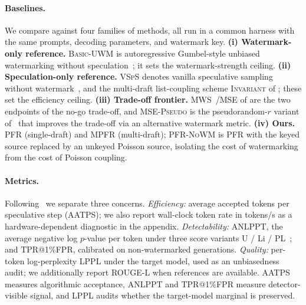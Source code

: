\paragraph{Baselines.}
We compare against four families of methods, all run in a common harness with
the same prompts, decoding parameters, and watermark key.
\textbf{(i) Watermark-only reference.} \textsc{Basic-UWM} is autoregressive
Gumbel-style unbiased watermarking without speculation~\citep{aaronson2023watermarking};
it sets the watermark-strength ceiling.
\textbf{(ii) Speculation-only reference.} \textsc{VSpS} denotes vanilla
speculative sampling without watermark~\citep{leviathan2023fast}, and the
multi-draft list-coupling scheme \textsc{Invariant} of \citet{rowan2025list};
these set the efficiency ceiling.
\textbf{(iii) Trade-off frontier.} \textsc{MWS}~/\textsc{MSE} of
\citet{hu2024inevitable} are the two endpoints of the no-go trade-off, and
\textsc{MSE-Pseudo} is the pseudorandom-$r$ variant
of~\citet{he2026improving} that improves the trade-off via an alternative
watermark metric.
\textbf{(iv) Ours.} \textsc{PFR} (single-draft) and \textsc{MPFR} (multi-draft);
\textsc{PFR-NoWM} is \textsc{PFR} with the keyed source replaced by an
unkeyed Poisson source, isolating the cost of watermarking from the cost of
Poisson coupling.

\paragraph{Metrics.}
Following~\citet{hu2024inevitable, he2026improving} we separate three concerns.
\emph{Efficiency:} average accepted tokens per speculative step (AATPS); we
also report wall-clock token rate in tokens/s as a hardware-dependent diagnostic
in the appendix.
\emph{Detectability:} ANLPPT, the average negative log $p$-value per token under
three score variants U / Li / PL~\citep{aaronson2023watermarking, li2025statistical, lattimore2026refined};
and TPR@1\%FPR, calibrated on non-watermarked generations.
\emph{Quality:} per-token log-perplexity LPPL under the target model, used as
an unbiasedness audit; we additionally report ROUGE-L when references are
available. AATPS measures algorithmic acceptance, ANLPPT and TPR@1\%FPR measure
detector-visible signal, and LPPL audits whether the target-model marginal is
preserved.

